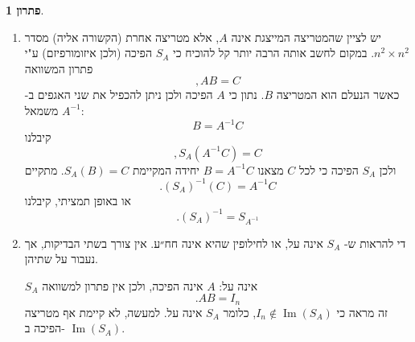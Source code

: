 \documentclass[12pt]{report}
\theoremstyle{plain}
\theoremstyle{definition}
\newtheorem*{solution}{פתרון}
\newcommand{\0}{\mathbf{0}}
\DeclareMathOperator{\Image}{Im}
\begin{document}
\begin{solution}\
\begin{enumerate}[label=\alph*.]
\item
יש לציין שהמטריצה המייצגת אינה 
$A$,
אלא מטריצה אחרת (הקשורה אליה) מסדר 
$n^2\times n^2$.
במקום לחשב אותה הרבה יותר קל
להוכיח כי
$S_A$
הפיכה (ולכן איזומורפיזם) ע"י פתרון המשוואה
$$
,AB=C
$$
כאשר הנעלם הוא המטריצה 
$B$.
נתון כי
$A$
הפיכה ולכן ניתן להכפיל את שני האגפים
ב-
$A^{-1}$
משמאל:
$$
B=A^{-1}C
$$
קיבלנו
$$
,S_A(A^{-1}C)=C
$$
ולכן
$S_A$
הפיכה כי לכל
$C$
מצאנו 
$B=A^{-1}C$
יחידה המקיימת
$S_A(B)=C$.
מתקיים
$$
.(S_A)^{-1}(C)=A^{-1}C
$$
או באופן תמציתי, קיבלנו
$$
.(S_A)^{-1}=S_{A^{-1}}
$$


\item 
די להראות ש-
$S_A$
אינה על, או לחילופין שהיא אינה חח״ע. אין צורך בשתי הבדיקות, אך נעבור על שתיהן.

$S_A$
אינה על:
$A$
אינה הפיכה, ולכן אין פתרון למשוואה
$$
.AB=I_n
$$
זה מראה כי
$I_n\notin \Image(S_A)$,
כלומר 
$S_A$
אינה על. למעשה, לא קיימת אף מטריצה הפיכה ב-
$\Image(S_A)$.



\end{enumerate}
\end{solution}
\end{document}
